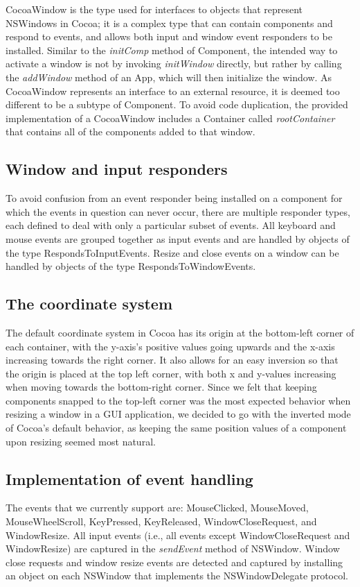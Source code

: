 \documentclass[a4paper]{article}
\begin{document}
CocoaWindow is the type used for interfaces to objects that represent NSWindows in Cocoa; it is a complex type that can contain components and respond to events, and allows both input and window event responders to be installed. Similar to the \textit{initComp} method of Component, the intended way to activate a window is not by invoking \textit{initWindow} directly, but rather by calling the \textit{addWindow} method of an App, which will then initialize the window. As CocoaWindow represents an interface to an external resource, it is deemed too different to be a subtype of Component. To avoid code duplication, the provided implementation of a CocoaWindow includes a Container called \textit{rootContainer} that contains all of the components added to that window.

\subsection{Window and input responders}
To avoid confusion from an event responder being installed on a component for which the events in question can never occur, there are multiple responder types, each defined to deal with only a particular subset of events. All keyboard and mouse events are grouped together as input events and are handled by objects of the type RespondsToInputEvents. Resize and close events on a window can be handled by objects of the type RespondsToWindowEvents.

\subsection{The coordinate system}

The default coordinate system in Cocoa has its origin at the bottom-left corner of each container, with the y-axis's positive values going upwards and the x-axis increasing towards the right corner. It also allows for an easy inversion so that the origin is placed at the top left corner, with both x and y-values increasing when moving towards the bottom-right corner. Since we felt that keeping components snapped to the top-left corner was the most expected behavior when resizing a window in a GUI application, we decided to go with the inverted mode of Cocoa's default behavior, as keeping the same position values of a component upon resizing seemed most natural. 

\subsection{Implementation of event handling}
The events that we currently support are: MouseClicked, MouseMoved, MouseWheelScroll, KeyPressed, KeyReleased, WindowCloseRequest, and WindowResize. All input events (i.e., all events except WindowCloseRequest and WindowResize) are captured in the \textit{sendEvent} method of NSWindow. Window close requests and window resize events are detected and captured by installing an object on each NSWindow that implements the NSWindowDelegate protocol.
\end{document}
